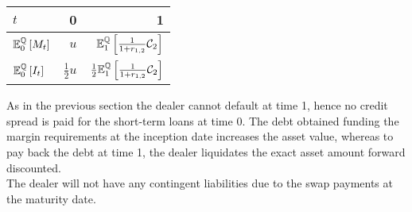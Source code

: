 \documentclass[main.tex]{subfiles}
\begin{document}
            \begin{table}[H]
                \centering
                \begin{tabular}{l|rr}
                    $t$ & 0 & 1 \\
                    \hline
                    \rule{0pt}{1.3em}
                    $\mathbb{E}_{0}^{\mathbb{Q}}\left[M_t\right]$ & $u$ & $\mathbb{E}_{1}^{\mathbb{Q}}\left[\frac{1}{1+r_{1,2}}\mathcal{C}_{2}\right]$ \\
                    \rule{0pt}{1.3em}
                    $\mathbb{E}_{0}^{\mathbb{Q}}\left[I_t\right]$ & $\frac{1}{2}u$ & $\frac{1}{2}\mathbb{E}_{1}^{\mathbb{Q}}\left[\frac{1}{1+r_{1,2}}\mathcal{C}_{2}\right]$ \\
                \end{tabular}
                \caption{}
                \label{tbl:swap-margin-postings}
            \end{table}

            As in the previous section the dealer cannot default at time 1,
            hence no credit spread is paid for the short-term loans at time 0.
            The debt obtained funding the margin requirements at the inception date increases the asset value,
            whereas to pay back the debt at time 1,
            the dealer liquidates the exact asset amount forward discounted.
            \\
            The dealer will not have any contingent liabilities due to the swap payments at the maturity date.
            
\end{document}
